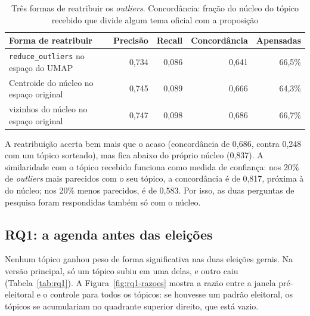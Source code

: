 \begin{table}[H]
\centering
\caption{Três formas de reatribuir os \textit{outliers}. Concordância: fração do núcleo do tópico recebido que divide algum tema oficial com a proposição}
\label{tab:reatrib}
\small
\begin{tabularx}{\textwidth}{>{\raggedright\arraybackslash}X r r r r}
\toprule
\textbf{Forma de reatribuir} & \textbf{Precisão} & \textbf{Recall} & \textbf{Concordância} & \textbf{Apensadas} \\
\midrule
\texttt{reduce\_outliers} no espaço do UMAP & 0,734 & 0,086 & 0,641 & 66,5\% \\
Centroide do núcleo no espaço original & 0,745 & 0,089 & 0,666 & 64,3\% \\
15 vizinhos do núcleo no espaço original & 0,747 & 0,098 & 0,686 & 66,7\% \\
\bottomrule
\end{tabularx}
\end{table}

A reatribuição acerta bem mais que o acaso (concordância de 0,686, contra 0,248 com um tópico sorteado), mas fica abaixo do próprio núcleo (0,837). A similaridade com o tópico recebido funciona como medida de confiança: nos 20\% de \textit{outliers} mais parecidos com o seu tópico, a concordância é de 0,817, próxima à do núcleo; nos 20\% menos parecidos, é de 0,583. Por isso, as duas perguntas de pesquisa foram respondidas também só com o núcleo.

\subsection{RQ1: a agenda antes das eleições}
\label{subsec:res-rq1}

Nenhum tópico ganhou peso de forma significativa nas duas eleições gerais. Na versão principal, só um tópico subiu em uma delas, e outro caiu (Tabela~\ref{tab:rq1}). A Figura~\ref{fig:rq1-razoes} mostra a razão entre a janela pré-eleitoral e o controle para todos os tópicos: se houvesse um padrão eleitoral, os tópicos se acumulariam no quadrante superior direito, que está vazio.

